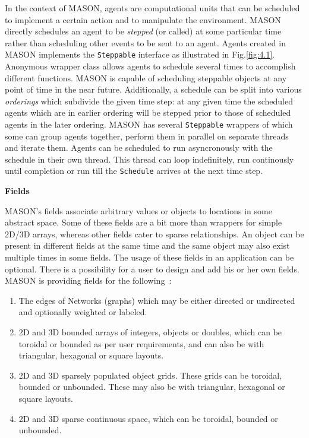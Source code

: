 \noindent In the context of MASON, agents are computational units that can be scheduled to implement a certain action and to manipulate the environment. MASON directly schedules an agent to be \textit{stepped} (or called) at some particular time rather than scheduling other events to be sent to an agent. Agents created in MASON implements the \texttt{Steppable} interface as illustrated in Fig.\ref{fig:4.1}. Anonymous wrapper class allows agents to schedule several times to  accomplish different functions. MASON is capable of scheduling steppable objects at any point of time in the near future. Additionally, a schedule can be split into various \textit{orderings} which subdivide the given time step: at any given time the scheduled agents which are in earlier ordering will be stepped prior to those of scheduled agents in the later ordering. MASON has several \texttt{Steppable} wrappers of which some can group agents together, perform them in parallel on separate threads and iterate them. Agents can be scheduled to run asyncronously with the schedule in their own thread. This thread can loop indefinitely, run continously until completion or run till the \texttt{Schedule} arrives at the next time step.

\vspace{0.5cm} 
\noindent\textbf{Fields}
\vspace{5mm}

\noindent MASON's fields associate arbitrary values or objects to locations in some abstract space. Some of these fields are a bit more than wrappers for simple 2D/3D arrays, whereas other fields cater to sparse relationships. An object can be present in different fields at the same time and the same object may also exist multiple times in some fields. The usage of these fields in an application can be optional. There is a possibility for a user to design and add his or her own fields. MASON is providing fields for the following~\cite{MASON2005}: 

\begin{enumerate}
 \item The edges of Networks (graphs) which may be either directed or undirected and optionally weighted or labeled.
 \item 2D and 3D bounded arrays of integers, objects or doubles, which can be toroidal or bounded as per user requirements, and can also be with triangular, hexagonal or square layouts.
 \item 2D and 3D sparsely populated object grids. These grids can be toroidal, bounded or unbounded. These may also be with triangular, hexagonal or square layouts.
 \item 2D and 3D sparse continuous space, which can be toroidal, bounded or unbounded.
\end{enumerate}
\vspace{5mm}

